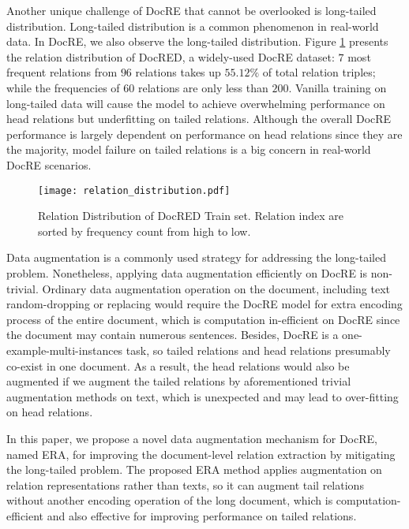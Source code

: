 \documentclass[11pt]{article}
\begin{document}
Another unique challenge of DocRE that cannot be overlooked is long-tailed distribution. Long-tailed distribution is a common phenomenon in real-world data. In DocRE, we also observe the long-tailed distribution. Figure \ref{fig:docred-long-tail-distribution} presents the relation distribution of DocRED\citep{yao-etal-2019-docred}, a widely-used DocRE dataset: $7$ most frequent relations from $96$ relations takes up $55.12\%$ of total relation triples; while the frequencies of $60$ relations are only less than $200$. Vanilla training on long-tailed data will cause the model to achieve overwhelming performance on head relations but underfitting on tailed relations. Although the overall DocRE performance is largely dependent on performance on head relations since they are the majority, model failure on tailed relations is a big concern in real-world DocRE scenarios. 
\begin{figure}[h]
    \centering
    \texttt{[image: relation\_distribution.pdf]}
    \caption{Relation Distribution of DocRED Train set. Relation index are sorted by frequency count from high to low.}
    \label{fig:docred-long-tail-distribution}
\end{figure}

Data augmentation is a commonly used strategy for addressing the long-tailed problem. Nonetheless, applying data augmentation efficiently on DocRE is non-trivial. Ordinary data augmentation operation on the document, including text random-dropping or replacing\citep{wei-zou-2019-eda} would require the DocRE model for extra encoding process of the entire document, which is computation in-efficient on DocRE since the document may contain numerous sentences. Besides, DocRE is a one-example-multi-instances task, so tailed relations and head relations presumably co-exist in one document. As a result, the head relations would also be augmented if we augment the tailed relations by aforementioned trivial augmentation methods on text, which is unexpected and may lead to over-fitting on head relations.

In this paper, we propose a novel data augmentation mechanism for DocRE, named ERA, for improving the document-level relation extraction by mitigating the long-tailed problem. The proposed ERA method applies augmentation on relation representations rather than texts, so it can augment tail relations without another encoding operation of the long document, which is computation-efficient and also effective for improving performance on tailed relations.
\end{document}
